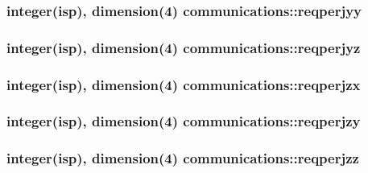 \subsubsection[{\texorpdfstring{reqperjyy}{reqperjyy}}]{\setlength{\rightskip}{0pt plus 5cm}integer(isp), dimension(4) communications\+::reqperjyy}\hypertarget{namespacecommunications_afc48247f3f83606f2b7c1e498621fcd5}{}\label{namespacecommunications_afc48247f3f83606f2b7c1e498621fcd5}
\subsubsection[{\texorpdfstring{reqperjyz}{reqperjyz}}]{\setlength{\rightskip}{0pt plus 5cm}integer(isp), dimension(4) communications\+::reqperjyz}\hypertarget{namespacecommunications_ae4760ee5787c5b5981856095495ea82d}{}\label{namespacecommunications_ae4760ee5787c5b5981856095495ea82d}
\subsubsection[{\texorpdfstring{reqperjzx}{reqperjzx}}]{\setlength{\rightskip}{0pt plus 5cm}integer(isp), dimension(4) communications\+::reqperjzx}\hypertarget{namespacecommunications_a9a0f53e00bdcaa044856f745008de045}{}\label{namespacecommunications_a9a0f53e00bdcaa044856f745008de045}
\subsubsection[{\texorpdfstring{reqperjzy}{reqperjzy}}]{\setlength{\rightskip}{0pt plus 5cm}integer(isp), dimension(4) communications\+::reqperjzy}\hypertarget{namespacecommunications_a76e287cb90a1968309c7e2370420748c}{}\label{namespacecommunications_a76e287cb90a1968309c7e2370420748c}
\subsubsection[{\texorpdfstring{reqperjzz}{reqperjzz}}]{\setlength{\rightskip}{0pt plus 5cm}integer(isp), dimension(4) communications\+::reqperjzz}\hypertarget{namespacecommunications_af38ed57408b60ed5170d54b350aa1b32}{}\label{namespacecommunications_af38ed57408b60ed5170d54b350aa1b32}
